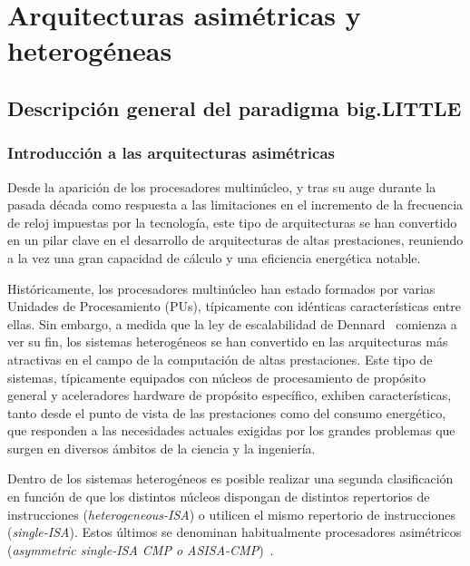 \cleardoublepage

\chapter{Arquitecturas asimétricas y heterogéneas}
\label{ch:chapter2}

\section{Descripción general del paradigma big.LITTLE}

\subsection{Introducción a las arquitecturas asimétricas}
\label{sec:arch_asym}

Desde la aparición de los procesadores multinúcleo, y tras su auge durante la pasada
década como respuesta a las limitaciones en el incremento de la frecuencia de reloj
impuestas por la tecnología, este tipo de arquitecturas se han convertido en un pilar
clave en el desarrollo de arquitecturas de altas prestaciones, reuniendo a la vez
una gran capacidad de cálculo y una eficiencia energética notable.

Históricamente, los procesadores multinúcleo han estado formados por varias 
Unidades de Procesamiento (PUs), típicamente con idénticas características entre ellas.
Sin embargo, a medida que la ley de escalabilidad de Dennard~\cite{Den74} comienza a 
ver su fin, los sistemas heterogéneos se han convertido en las arquitecturas más 
atractivas en el campo de la computación de altas prestaciones. Este tipo de sistemas,
típicamente equipados con núcleos de procesamiento de propósito general y aceleradores
hardware de propósito específico, exhiben características, tanto desde el punto de vista
de las prestaciones como del consumo energético, que responden a las necesidades actuales
exigidas por los grandes problemas que surgen en diversos ámbitos de la ciencia y la
ingeniería.

Dentro de los sistemas heterogéneos es posible realizar una segunda clasificación en función de que los
distintos núcleos dispongan de distintos repertorios de instrucciones ({\em heterogeneous-ISA}) 
o utilicen el mismo repertorio de instrucciones ({\em single-ISA}). Estos últimos se denominan
habitualmente procesadores asimétricos ({\em asymmetric single-ISA CMP o ASISA-CMP})~\cite{survey_asym}.


